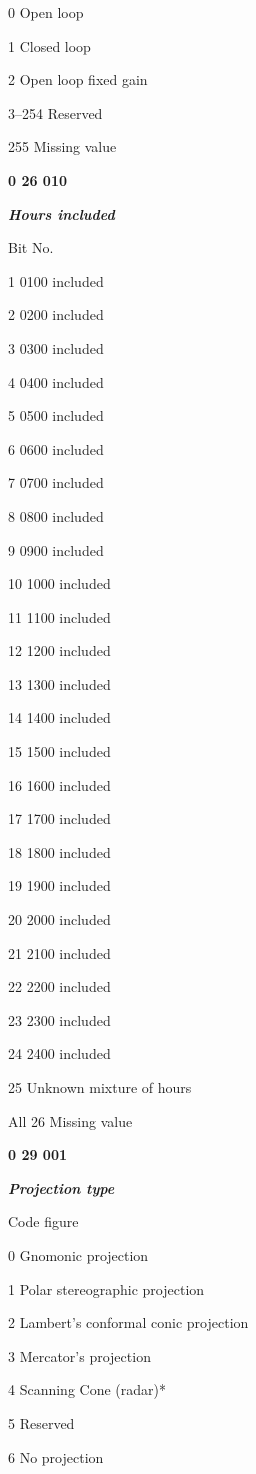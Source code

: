 0 Open loop

1 Closed loop

2 Open loop fixed gain

3--254 Reserved

255 Missing value

\textbf{0 26 010}

\emph{\textbf{Hours included}}

Bit No.

1 0100 included

2 0200 included

3 0300 included

4 0400 included

5 0500 included

6 0600 included

7 0700 included

8 0800 included

9 0900 included

10 1000 included

11 1100 included

12 1200 included

13 1300 included

14 1400 included

15 1500 included

16 1600 included

17 1700 included

18 1800 included

19 1900 included

20 2000 included

21 2100 included

22 2200 included

23 2300 included

24 2400 included

25 Unknown mixture of hours

All 26 Missing value

\textbf{0 29 001}

\emph{\textbf{Projection type}}

Code figure

0 Gnomonic projection

1 Polar stereographic projection

2 Lambert's conformal conic projection

3 Mercator's projection

4 Scanning Cone (radar)*

5 Reserved

6 No projection

